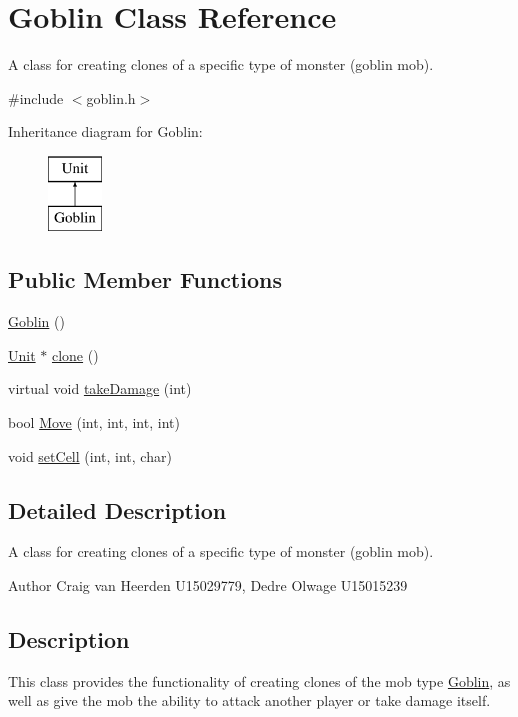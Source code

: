 \hypertarget{class_goblin}{\section{\-Goblin \-Class \-Reference}
\label{class_goblin}
}


\-A class for creating clones of a specific type of monster (goblin mob).  




{\ttfamily \#include $<$goblin.\-h$>$}

\-Inheritance diagram for \-Goblin\-:\begin{figure}[H]
\begin{center}
\leavevmode
\includegraphics[height=2.000000cm]{class_goblin}
\end{center}
\end{figure}
\subsection*{\-Public \-Member \-Functions}
\begin{DoxyCompactItemize}
\item 
\hyperlink{class_goblin_a22d43a81f99697e13d13a0c56fae9bc4}{\-Goblin} ()
\item 
\hyperlink{class_unit}{\-Unit} $\ast$ \hyperlink{class_goblin_a7920586a74c14792a5d79ac41c5d9da4}{clone} ()
\item 
virtual void \hyperlink{class_goblin_aafe3cab551e660aa6cf6be4fe35660f8}{take\-Damage} (int)
\item 
bool \hyperlink{class_goblin_a7ad62afcca03c9ed97a723bace9c4f8a}{\-Move} (int, int, int, int)
\item 
void \hyperlink{class_goblin_a349c2f345c5cb19f46710016b47837d1}{set\-Cell} (int, int, char)
\end{DoxyCompactItemize}


\subsection{\-Detailed \-Description}
\-A class for creating clones of a specific type of monster (goblin mob). 

\begin{DoxyAuthor}{\-Author}
\-Craig van \-Heerden \-U15029779, \-Dedre \-Olwage \-U15015239
\end{DoxyAuthor}
\hypertarget{class_unit_factory_Description}{}\subsection{\-Description}\label{class_unit_factory_Description}
\-This class provides the functionality of creating clones of the mob type \hyperlink{class_goblin}{\-Goblin}, as well as give the mob the ability to attack another player or take damage itself. 

